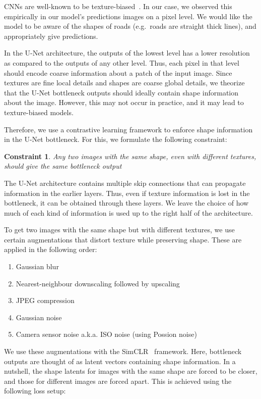 CNNs are well-known to be texture-biased~\cite{texture-bias-1,texture-bias-2,texture-bias-3,texture-bias-4,texture-bias-5}.
In our case, we observed this empirically in our model's predictions images on a pixel level.
We would like the model to be aware of the shapes of roads (e.g.\ roads are straight thick lines), and appropriately give predictions.

In the U-Net architecture, the outputs of the lowest level has a lower resolution as compared to the outputs of any other level.
Thus, each pixel in that level should encode coarse information about a patch of the input image.
Since textures are fine local details and shapes are coarse global details, we theorize that the U-Net bottleneck outputs should ideally contain shape information about the image.
However, this may not occur in practice, and it may lead to texture-biased models.

Therefore, we use a contrastive learning framework to enforce shape information in the U-Net bottleneck.
For this, we formulate the following constraint:

\newtheorem*{constraint}{Constraint}
\begin{constraint}
Any two images with the same shape, even with different textures, should give the same bottleneck output
\end{constraint}

The U-Net architecture contains multiple skip connections that can propagate information in the earlier layers.
Thus, even if texture information is lost in the bottleneck, it can be obtained through these layers.
We leave the choice of how much of each kind of information is used up to the right half of the architecture.

To get two images with the same shape but with different textures, we use certain augmentations that distort texture while preserving shape.
These are applied in the following order:
\begin{enumerate}
    \item Gaussian blur
    \item Nearest-neighbour downscaling followed by upscaling
    \item JPEG compression
    \item Gaussian noise
    \item Camera sensor noise a.k.a. ISO noise (using Possion noise)
\end{enumerate}

We use these augmentations with the SimCLR~\cite{simclr} framework.
Here, bottleneck outputs are thought of as latent vectors containing shape information.
In a nutshell, the shape latents for images with the same shape are forced to be closer, and those for different images are forced apart.
This is achieved using the following loss setup:

